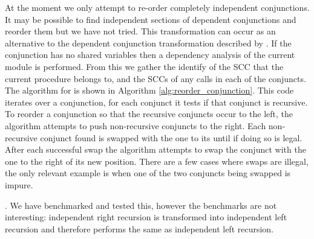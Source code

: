 At the moment we only attempt to re-order completely independent
conjunctions.
It may be possible to find independent sections of dependent conjunctions
and reorder them but we have not tried.
This transformation can occur as an alternative to the dependent conjunction
transformation described by \citep{wang:2011:dep-par}.
If the conjunction has no shared variables then a dependency analysis of the
current module is performed.
From this we gather the identify of the SCC that the current procedure
belongs to,
and the SCCs of any calls in each of the conjuncts.
The algorithm for  is shown in Algorithm
\ref{alg:reorder_conjunction}.
This code iterates over a conjunction, for each conjunct it tests if that
conjunct is recursive.
To reorder a conjunction so that the recursive conjuncts occur to the left,
the algorithm attempts to push non-recursive conjuncts to the right.
Each non-recursive conjunct found is swapped with the one to its until if
doing so is legal.
After each successful swap the algorithm attempts to swap the conjunct with
the one to the right of its new position.
There are a few cases where swaps are illegal, the only relevant example is
when one of the two conjuncts being swapped is impure.

.
We have benchmarked and tested this,
however the benchmarks are not interesting:
independent right recursion is transformed into independent left
recursion and therefore performs the same as independent left recursion.

